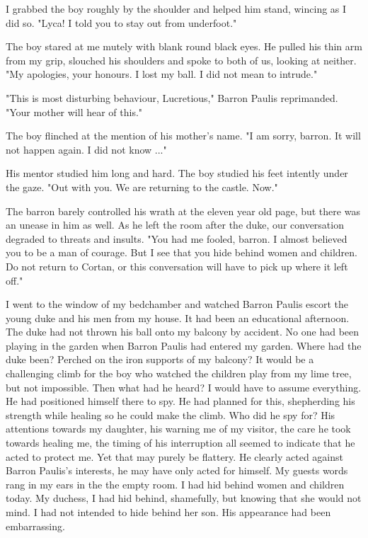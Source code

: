 \documentclass{article}
\begin{document}
I grabbed the boy roughly by the shoulder and helped him stand, wincing as I did so. "Lyca! I told you to stay out from underfoot."

The boy stared at me mutely with blank round black eyes. He pulled his thin arm from my grip, slouched his shoulders and spoke to both of us, looking at neither. "My apologies, your honours. I lost my ball. I did not mean to intrude."

"This is most disturbing behaviour, Lucretious," Barron Paulis reprimanded. "Your mother will hear of this." 

The boy flinched at the mention of his mother's name. "I am sorry, barron. It will not happen again. I did not know ..."

His mentor studied him long and hard. The boy studied his feet intently under the gaze. "Out with you. We are returning to the castle. Now." 

The barron barely controlled his wrath at the eleven year old page, but there was an unease in him as well. As he left the room after the duke, our conversation degraded to threats and insults. "You had me fooled, barron. I almost believed you to be a man of courage. But I see that you hide behind women and children. Do not return to Cortan, or this conversation will have to pick up where it left off."

I went to the window of my bedchamber and watched Barron Paulis escort the young duke and his men from my house. It had been an educational afternoon. The duke had not thrown his ball onto my balcony by accident. No one had been playing in the garden when Barron Paulis had entered my garden. Where had the duke been? Perched on the iron supports of my balcony? It would be a challenging climb for the boy who watched the children play from my lime tree, but not impossible. Then what had he heard? I would have to assume everything. He had positioned himself there to spy. He had planned for this, shepherding his strength while healing so he could make the climb. Who did he spy for? His attentions towards my daughter, his warning me of my visitor, the care he took towards healing me, the timing of his interruption all seemed to indicate that he acted to protect me. Yet that may purely be flattery. He clearly acted against Barron Paulis's interests, he may have only acted for himself. My guests words rang in my ears in the the empty room. I had hid behind women and children today. My duchess, I had hid behind, shamefully, but knowing that she would not mind. I had not intended to hide behind her son. His appearance had been embarrassing. 
\end{document}
